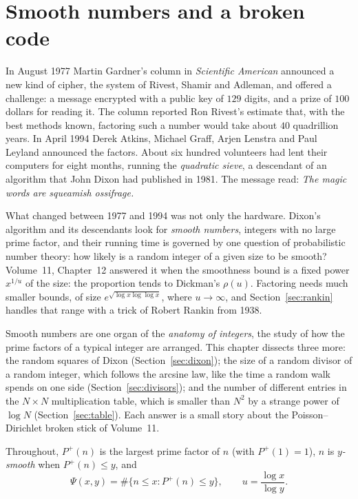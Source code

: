 \section{Smooth numbers and a broken code}

In August 1977 Martin Gardner's column in \emph{Scientific American} announced a new kind of cipher, the system of Rivest, Shamir and Adleman, and offered a challenge: a message encrypted with a public key of $129$ digits, and a prize of $100$ dollars for reading it. The column reported Ron Rivest's estimate that, with the best methods known, factoring such a number would take about $40$ quadrillion years. In April 1994 Derek Atkins, Michael Graff, Arjen Lenstra and Paul Leyland announced the factors. About six hundred volunteers had lent their computers for eight months, running the \emph{quadratic sieve}, a descendant of an algorithm that John Dixon had published in 1981. The message read: \emph{The magic words are squeamish ossifrage.}

What changed between 1977 and 1994 was not only the hardware. Dixon's algorithm and its descendants look for \emph{smooth numbers}, integers with no large prime factor, and their running time is governed by one question of probabilistic number theory: how likely is a random integer of a given size to be smooth? Volume~11, Chapter~12 answered it when the smoothness bound is a fixed power $x^{1/u}$ of the size: the proportion tends to Dickman's $\rho(u)$. Factoring needs much smaller bounds, of size $e^{\sqrt{\log x\log\log x}}$, where $u\to\infty$, and Section~\ref{sec:rankin} handles that range with a trick of Robert Rankin from 1938.

Smooth numbers are one organ of the \emph{anatomy of integers}, the study of how the prime factors of a typical integer are arranged. This chapter dissects three more: the random squares of Dixon (Section~\ref{sec:dixon}); the size of a random divisor of a random integer, which follows the arcsine law, like the time a random walk spends on one side (Section~\ref{sec:divisors}); and the number of different entries in the $N\times N$ multiplication table, which is smaller than $N^2$ by a strange power of $\log N$ (Section~\ref{sec:table}). Each answer is a small story about the Poisson--Dirichlet broken stick of Volume~11.

Throughout, $P^+(n)$ is the largest prime factor of $n$ (with $P^+(1)=1$), $n$ is \emph{$y$-smooth} when $P^+(n)\le y$, and
\[
\Psi(x,y)=\#\{n\le x:P^+(n)\le y\},\qquad u=\frac{\log x}{\log y}.
\]

